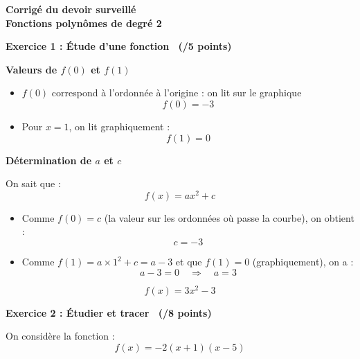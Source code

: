 \documentclass[12pt,a4paper]{exam}
\begin{document}
\begin{center}
    \Large\textbf{Corrigé du devoir surveillé\\Fonctions polynômes de degré 2}
\end{center}

\vspace{0.5cm}

\noindent
\textbf{Exercice 1 : Étude d’une fonction \ (/5 points)}

\vspace{5pt}

\begin{questions}

\question \textbf{Valeurs de $f(0)$ et $f(1)$}

\begin{itemize}
    \item $f(0)$ correspond à l’ordonnée à l’origine : on lit sur le graphique  
    \[
    f(0) = -3
    \]
    \item Pour $x=1$, on lit graphiquement :
    \[
    f(1) = 0
    \]
\end{itemize}

\question \textbf{Détermination de $a$ et $c$}

On sait que :
\[
f(x) = ax^2 + c
\]

\begin{itemize}
    \item Comme $f(0) = c$ (la valeur sur les ordonnées où passe la 
    courbe), on obtient :
    \[
    c = -3
    \]
    \item Comme $f(1) = a \times 1^2 + c = a - 3$ et que $f(1) = 0$ (graphiquement), on a :
    \[
    a - 3 = 0 \quad \Rightarrow \quad a = 3
    \]
\end{itemize}

\[
\boxed{f(x)=3x^2-3}
\]

\end{questions}

\vspace{0.5cm}

\noindent
\textbf{Exercice 2 : Étudier et tracer \ (/8 points)}

\vspace{0.3cm}
On considère la fonction :
\[
f(x) = -2(x+1)(x-5)
\]
\end{document}
